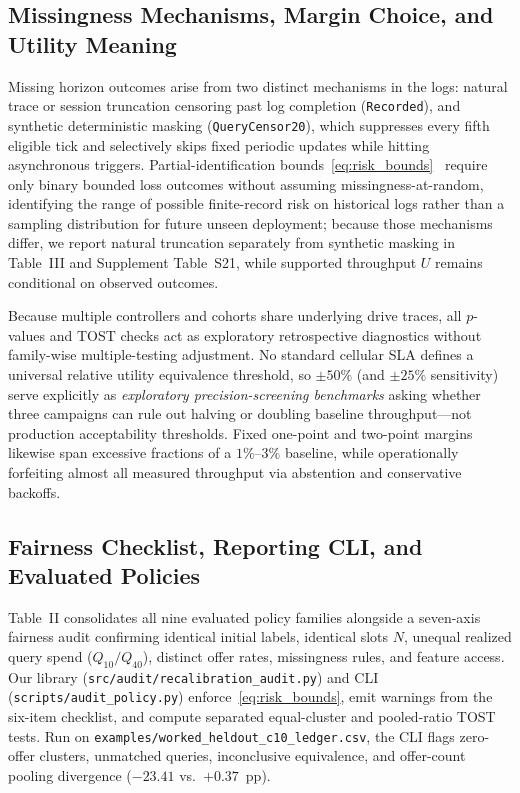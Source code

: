 \documentclass[journal,10pt]{IEEEtran}
\begin{document}
\subsection{Missingness Mechanisms, Margin Choice, and Utility Meaning}
Missing horizon outcomes arise from two distinct mechanisms in the logs: natural trace or session truncation censoring past log completion (\texttt{Recorded}), and synthetic deterministic masking (\texttt{QueryCensor20}), which suppresses every fifth eligible tick and selectively skips fixed periodic updates while hitting asynchronous triggers. Partial-identification bounds~\eqref{eq:risk_bounds}~\cite{manski1989selection} require only binary bounded loss outcomes without assuming missingness-at-random, identifying the range of possible finite-record risk on historical logs rather than a sampling distribution for future unseen deployment; because those mechanisms differ, we report natural truncation separately from synthetic masking in Table~III and Supplement Table~S21, while supported throughput $U$ remains conditional on observed outcomes.

Because multiple controllers and cohorts share underlying drive traces, all $p$-values and TOST checks act as exploratory retrospective diagnostics without family-wise multiple-testing adjustment. No standard cellular SLA defines a universal relative utility equivalence threshold, so $\pm 50\%$ (and $\pm 25\%$ sensitivity) serve explicitly as \emph{exploratory precision-screening benchmarks} asking whether three campaigns can rule out halving or doubling baseline throughput---not production acceptability thresholds. Fixed one-point and two-point margins likewise span excessive fractions of a $1\%$--$3\%$ baseline, while operationally forfeiting almost all measured throughput via abstention and conservative backoffs.

\subsection{Fairness Checklist, Reporting CLI, and Evaluated Policies}
Table~II consolidates all nine evaluated policy families alongside a seven-axis fairness audit confirming identical initial labels, identical slots $N$, unequal realized query spend ($Q_{10}/Q_{40}$), distinct offer rates, missingness rules, and feature access. Our library (\texttt{src/audit/\allowbreak recalibration\_audit.py}) and CLI (\texttt{scripts/\allowbreak audit\_policy.py}) enforce~\eqref{eq:risk_bounds}, emit warnings from the six-item checklist, and compute separated equal-cluster and pooled-ratio TOST tests. Run on \texttt{examples/\allowbreak worked\_heldout\_c10\_ledger.csv}, the CLI flags zero-offer clusters, unmatched queries, inconclusive equivalence, and offer-count pooling divergence ($-23.41$ vs.\ $+0.37$~pp).
\end{document}

